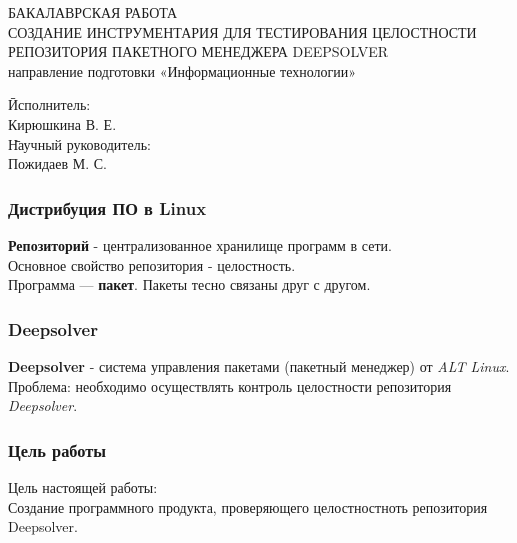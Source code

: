 \documentclass{beamer}
\begin{document}
\begin{frame}
\begin{center}
БАКАЛАВРСКАЯ РАБОТА\\
\vspace{1cm}
{ СОЗДАНИЕ ИНСТРУМЕНТАРИЯ ДЛЯ ТЕСТИРОВАНИЯ ЦЕЛОСТНОСТИ РЕПОЗИТОРИЯ ПАКЕТНОГО МЕНЕДЖЕРА DEEPSOLVER}
\\
направление подготовки
«Информационные технологии»
\end{center}
\begin{tabbing}
\hspace{6.5cm} \= Исполнитель:\\
\> Кирюшкина В. Е.\\
\vspace{0.5cm}
\hspace{6.5cm} \= Научный руководитель:\\
\> Пожидаев М. С.\\
\end{tabbing}
\end{frame}

\begin{frame}
\frametitle{Дистрибуция ПО в Linux}
\textbf{Репозиторий} - централизованное хранилище программ в сети.\\
\vspace{0.5cm}
Основное свойство репозитория - целостность.\\
\vspace{0.5cm}
Программа --- \textbf{пакет}. Пакеты тесно связаны друг с другом.

\end{frame}

\begin{frame}
\frametitle{Deepsolver}
\textbf{Deepsolver} - система управления пакетами (пакетный менеджер) от \textit{ALT Linux}.\\
\vspace{0.5cm}
Проблема: необходимо осуществлять контроль целостности репозитория \textit{Deepsolver}. 

\end{frame}

\begin{frame}
\frametitle{Цель работы}
Цель настоящей работы:\\
Создание  программного 
продукта, проверяющего целостностноть репозитория Deepsolver.

\end{frame}
\end{document}
